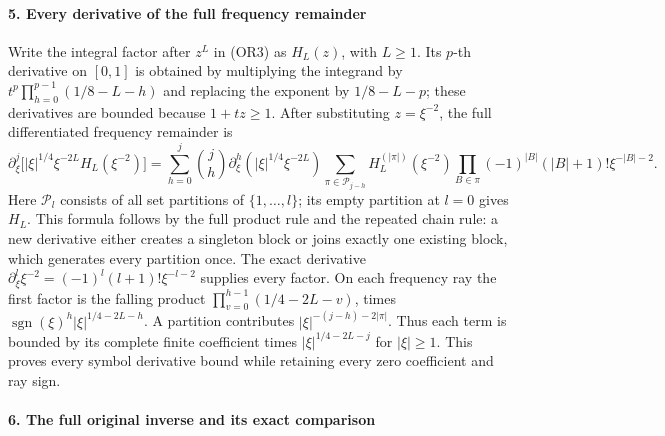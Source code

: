 \documentclass[
  11pt,
]{article}
\begin{document}
\paragraph{5. Every derivative of the full frequency
remainder}\label{every-derivative-of-the-full-frequency-remainder}

Write the integral factor after \(z^L\) in (OR3) as \(H_L(z)\), with
\(L\geq1\). Its \(p\)-th derivative on \([0,1]\) is obtained by
multiplying the integrand by \(t^p\prod_{h=0}^{p-1}(1/8-L-h)\) and
replacing the exponent by \(1/8-L-p\); these derivatives are bounded
because \(1+tz\geq1\). After substituting \(z=\xi^{-2}\), the full
differentiated frequency remainder is \[
 \partial_\xi^j\big[|\xi|^{1/4}\xi^{-2L}H_L(\xi^{-2})\big]
 =\sum_{h=0}^j\binom jh\partial_\xi^h(|\xi|^{1/4}\xi^{-2L})
 \sum_{\pi\in\mathcal P_{j-h}}H_L^{(|\pi|)}(\xi^{-2})
 \prod_{B\in\pi}(-1)^{|B|}(|B|+1)!\xi^{-|B|-2}.
 \tag{OR3a}
\] Here \(\mathcal P_l\) consists of all set partitions of
\(\{1,\ldots,l\}\); its empty partition at \(l=0\) gives \(H_L\). This
formula follows by the full product rule and the repeated chain rule: a
new derivative either creates a singleton block or joins exactly one
existing block, which generates every partition once. The exact
derivative \(\partial_\xi^l\xi^{-2}=(-1)^l(l+1)!\xi^{-l-2}\) supplies
every factor. On each frequency ray the first factor is the falling
product \(\prod_{v=0}^{h-1}(1/4-2L-v)\), times
\(\operatorname{sgn}(\xi)^h|\xi|^{1/4-2L-h}\). A partition contributes
\(|\xi|^{-(j-h)-2|\pi|}\). Thus each term is bounded by its complete
finite coefficient times \(|\xi|^{1/4-2L-j}\) for \(|\xi|\geq1\). This
proves every symbol derivative bound while retaining every zero
coefficient and ray sign.

\paragraph{6. The full original inverse and its exact
comparison}\label{the-full-original-inverse-and-its-exact-comparison}
\end{document}
